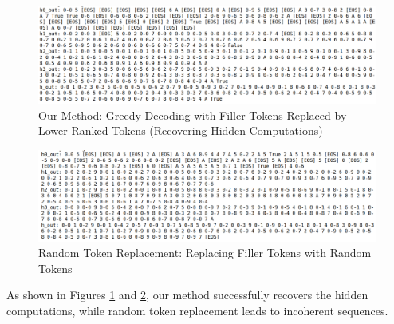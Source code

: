 \documentclass{article}
\begin{document}
\begin{figure}[H]
    \centering
    \includegraphics[width=\textwidth]{our_method_decoding.png}
    \caption{Our Method: Greedy Decoding with Filler Tokens Replaced by Lower-Ranked Tokens (Recovering Hidden Computations)}
    \label{fig:our-method}
\end{figure}

\begin{figure}[H]
    \centering
    \includegraphics[width=\textwidth]{random_tokens_decoding.png}
    \caption{Random Token Replacement: Replacing Filler Tokens with Random Tokens}
    \label{fig:random}
\end{figure}

As shown in Figures \ref{fig:our-method} and \ref{fig:random}, our method successfully recovers the hidden computations, while random token replacement leads to incoherent sequences.

\clearpage
\end{document}
